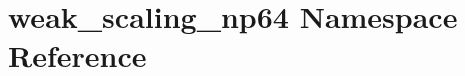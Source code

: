\hypertarget{namespaceweak__scaling__np64}{}\section{weak\+\_\+scaling\+\_\+np64 Namespace Reference}
\label{namespaceweak__scaling__np64}
